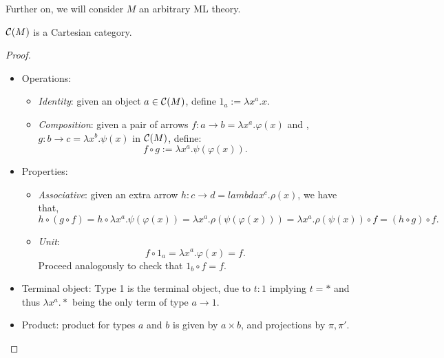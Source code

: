 Further on, we will consider $M$ an arbitrary ML theory.
\begin{proposition}\label{prop:CM1}
  $\mathcal{C}(M)$ is a Cartesian category.
\end{proposition}
\begin{proof}
  \begin{itemize}
  \item Operations:
    \begin{itemize}
      
    \item \emph{Identity}: given an object $a\in \mathcal{C}(M)$, define $1_a := \lambda x^a.x$. 
    \item \emph{Composition}: given a pair of arrows $f:a\to b =  \lambda x^a. \varphi(x)$ and , $g:b \to c = \lambda x^b. \psi(x)$ in $\mathcal{C}(M)$, define:
      $$f\circ g := \lambda x^a. \psi (\varphi(x)). $$
    \end{itemize}

  \item Properties:
    \begin{itemize}
    \item \emph{Associative}: given an extra arrow $h:c\to d = lambda x^c. \rho(x)$, we have that,
      $$h \circ (g\circ f)  = h\circ \lambda x^a.\psi(\varphi(x))  = \lambda x^a.\rho(\psi(\varphi(x))) =  \lambda x^a.\rho(\psi(x)) \circ f =  (h\circ g)\circ f.$$
    \item \emph{Unit}: 
      $$f \circ 1_a = \lambda x^a. \varphi(x) = f.$$
      Proceed analogously to check that $1_b \circ f =f$.
    \end{itemize}


  \item Terminal object: Type 1 is the terminal object, due to $t: 1$ implying $t=*$ and thus $\lambda x^a. *$ being the only term of type $a\to 1$. 
  \item Product:  product for types $a$ and $b$ is given by $a\times b$, and projections by $\pi, \pi'$.
  \end{itemize}
\end{proof}

